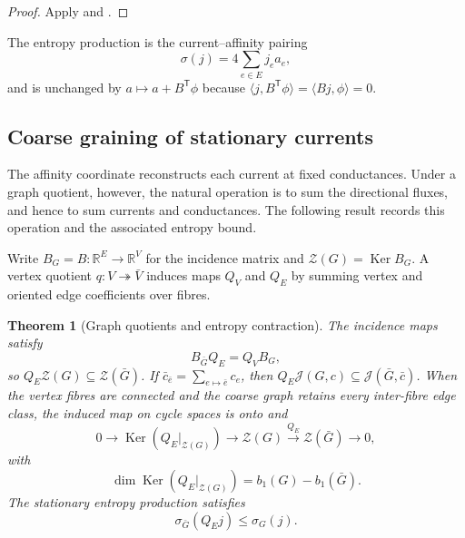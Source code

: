 \documentclass[11pt]{article}
\newtheorem{theorem}{Theorem}[section]
\theoremstyle{definition}
\theoremstyle{remark}
\theoremstyle{definition}
\theoremstyle{remark}
\newcommand{\Ker}{\operatorname{Ker}}
\begin{document}
\begin{proof}
Apply  and
.
\end{proof}

The entropy production is the current--affinity pairing
\begin{equation}
 {\sigma(j)=4\sum_{e\in E}j_ea_e,}
 \label{eq:supp-entropy-modular-pairing}
\end{equation}
and is unchanged by $a\mapsto a+B^{\mathsf T}\phi$ because
$\langle j,B^{\mathsf T}\phi\rangle=\langle Bj,\phi\rangle=0$.

\subsection{Coarse graining of stationary currents}
\label{subsec:current-coarse-graining}

The affinity coordinate reconstructs each current at fixed conductances.
Under a graph quotient, however, the natural operation is to sum the
directional fluxes, and hence to sum currents and conductances.  The
following result records this operation and the associated entropy bound.

Write $B_G=B:\mathbb R^E\to\mathbb R^V$ for the incidence matrix and
$\mathcal Z(G)=\Ker B_G$.  A vertex quotient $q:V\twoheadrightarrow\bar V$
induces maps $Q_V$ and $Q_E$ by summing vertex and oriented edge coefficients over
fibres.

\begin{theorem}[Graph quotients and entropy contraction]
\label{thm:supp-current-chain}
The incidence maps satisfy
\begin{equation}
{B_{\bar G}Q_E=Q_VB_G,}
\label{eq:supp-current-chain}
\end{equation}
so $Q_E\mathcal Z(G)\subseteq\mathcal Z(\bar G)$.  If
$\bar c_{\bar e}=\sum_{e\mapsto\bar e}c_e$, then
$Q_E\mathcal J(G,c)\subseteq\mathcal J(\bar G,\bar c)$.  When the vertex fibres are
connected and the coarse graph retains every inter-fibre edge class, the induced
map on cycle spaces is onto and
\begin{equation}
0\longrightarrow\Ker(Q_E|_{\mathcal Z(G)})
\longrightarrow\mathcal Z(G)
\xrightarrow{Q_E}\mathcal Z(\bar G)
\longrightarrow0,
\label{eq:supp-cycle-exact}
\end{equation}
with
\begin{equation}
\dim\Ker(Q_E|_{\mathcal Z(G)})=b_1(G)-b_1(\bar G).
\label{eq:supp-cycle-kernel-dim}
\end{equation}
The stationary entropy production satisfies
\begin{equation}
\sigma_{\bar G}(Q_Ej)\le\sigma_G(j).
\label{eq:supp-entropy-contraction}
\end{equation}
\end{theorem}
\end{document}
